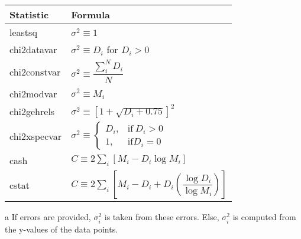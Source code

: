 \centering
\begin{threeparttable}
\begin{tabular*}{0.47\textwidth}{@{\extracolsep{\fill}}ll}
    \toprule
	Statistic & Formula \\
	\midrule
	leastsq \rule{0pt}{3ex} & $\sigma^{2} \equiv 1$ \\
	chi2datavar\tnote{a} \rule{0pt}{3ex}  & $\sigma^{2} \equiv D_{i}$ for $D_{i} > 0$ \\
	chi2constvar \rule{0pt}{3ex} & $\sigma^{2} \equiv \dfrac{\sum_{i}^{N} D_{i}}{N}$ \\
	chi2modvar\tnote{b} \rule{0pt}{3ex} & $\sigma^{2} \equiv M_{i}$ \\
	chi2gehrels \rule{0pt}{3ex} & $\sigma^{2} \equiv \left[1 + \sqrt{D_{i} + 0.75}\right]^{2}$ \\
	chi2xspecvar \rule{0pt}{5ex} & $\sigma^{2} \equiv 
		\begin{cases}
			D_{i}, & \text{if}\ D_{i} > 0 \\
			1, & \text{if} D_{i} = 0
		\end{cases}$ \\
	cash \rule{0pt}{3ex} & $C \equiv 2 \sum_{i}[M_{i} - D_{i} \log{M_{i}}]$ \\
	cstat \rule{0pt}{4ex} & $C \equiv 2 \sum_{i}\left[M_{i} - D_{i} + 
							D_{i} \left(\dfrac{\log{D_{i}}}{\log{M_{i}}}\right)\right]$ \\
    \bottomrule
\end{tabular*}
\begin{tablenotes}
\item [a] If errors are provided, $\sigma_{i}^{2}$ is taken from these errors.
		  Else, $\sigma_{i}^{2}$ is computed from the y-values of the data points.
\end{tablenotes}
\end{threeparttable}

